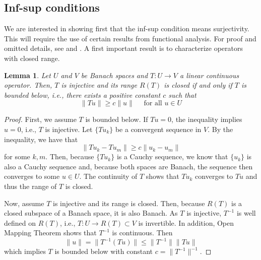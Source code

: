 \documentclass{article}
\newtheorem{lemma}{Lemma}
\begin{document}
\subsection{Inf-sup conditions}

We are interested in showing first that the inf-sup condition means 
surjectivity. This will require the use of certain results from 
functional analysis. For proof and omitted details, see \cite{chen2024infSup} 
and \cite{gatica2014simple}. A first important result is to characterize 
operators with closed range. 

\begin{lemma}
    Let \(U\) and \( V\) be Banach spaces and \(T:U\to V\) a linear 
    continuous operator. Then, \(T\) is injective and its range \(R(T)\) is 
    closed if and only if  \(T\) is bounded below, i.e., there exists 
    a positive constant \(c\) such that 
    \begin{displaymath}
        \lVert Tu \rVert \ge c\lVert u \rVert
        \quad \text{ for all } u\in U
    \end{displaymath}
\end{lemma}
\begin{proof}
    First, we assume \(T\) is bounded below. If \(Tu=0\), the inequality 
    implies \(u=0\), i.e., \(T\) is injective. Let \(\{Tu_k\}\) be a convergent 
    sequence in \(V\). By the inequality, we have that
    \begin{displaymath}
        \lVert Tu_k - Tu_m \rVert \ge c\lVert u_k - u_m \rVert
    \end{displaymath}
    for some \(k,m\). Then, because \(\{Tu_k\}\) is a Cauchy sequence, we 
    know that \(\{u_k\}\) is also a Cauchy sequence and, because both spaces 
    are Banach, the sequence then converges to some \(u\in U\). The continuity 
    of \(T\) shows that \(Tu_k\) converges to \(Tu\) and thus the range of 
    \(T\) is closed. 

    Now, assume \(T\) is injective and its range is closed. Then, because 
    \(R(T)\) is a closed subspace of a Banach space, it is also Banach. As 
    \( T\) is injective, \(T^{-1}\) is well defined on \(R(T)\), i.e., 
    \(T:U\to R(T)\subset V\) is invertible. In addition, Open Mapping Theorem 
    shows that \(T^{-1}\) is continuous. Then
    \begin{displaymath}
        \lVert u \rVert = \lVert T^{-1}(Tu) \rVert 
        \le \lVert T^{-1} \rVert \lVert Tu \rVert 
    \end{displaymath}
    which implies \(T\) is bounded below with constant 
    \(c = \lVert T^{-1} \rVert^{-1}\).
\end{proof}
\end{document}
